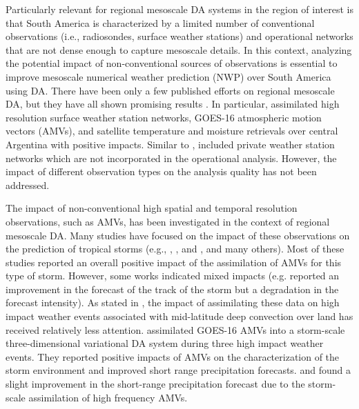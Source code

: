 \documentclass[preprint, 3p, authoryear,review, 12pt]{elsarticle} %
\begin{document}
Particularly relevant for regional mesoscale DA systems in the region of interest is that South America is characterized by a limited number of conventional observations (i.e., radiosondes, surface weather stations) and operational networks that are not dense enough to capture mesoscale details. In this context, analyzing the potential impact of non-conventional sources of observations is essential to improve mesoscale numerical weather prediction (NWP) over South America using DA. There have been only a few published efforts on regional mesoscale DA, but they have all shown promising results \citep[e.g.][]{dillon2016, dillon2021, goncalvesdegoncalves2015}. In particular, \citet{dillon2021} assimilated high resolution surface weather station networks, GOES-16 atmospheric motion vectors (AMVs), and satellite temperature and moisture retrievals over central Argentina with positive impacts. Similar to \citet{gasperoni2018}, \citet{dillon2021} included private weather station networks which are not incorporated in the operational analysis. However, the impact of different observation types on the analysis quality has not been addressed.

The impact of non-conventional high spatial and temporal resolution observations, such as AMVs, has been investigated in the context of regional mesoscale DA. Many studies have focused on the impact of these observations on the prediction of tropical storms (e.g., \citet{wu2014}, \citet{cherubini2006}, and \citet{sawada2019}, and many others). Most of these studies reported an overall positive impact of the assimilation of AMVs for this type of storm. However, some works indicated mixed impacts (e.g. \citet{sawada2019} reported an improvement in the forecast of the track of the storm but a degradation in the forecast intensity). As stated in \citet{zhao2021, zhao2021a}, the impact of assimilating these data on high impact weather events associated with mid-latitude deep convection over land has received relatively less attention. \citet{zhao2021, zhao2021a} assimilated GOES-16 AMVs into a storm-scale three-dimensional variational DA system during three high impact weather events. They reported positive impacts of AMVs on the characterization of the storm environment and improved short range precipitation forecasts. \citet{otsuka2015} and \citet{mallick2020} found a slight improvement in the short-range precipitation forecast due to the storm-scale assimilation of high frequency AMVs.
\end{document}
